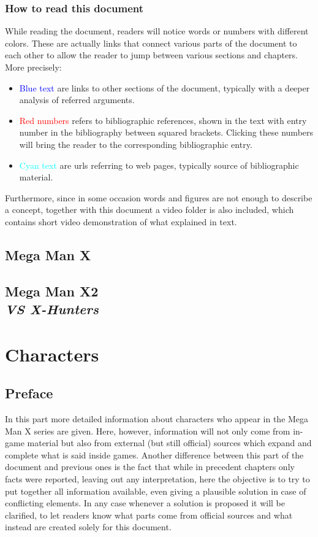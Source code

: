 \documentclass[openany]{report}
\begin{document}
	\section*{How to read this document}
	While reading the document, readers will notice words or numbers with different colors. These are actually links that connect various parts of the document to each other to allow the reader to jump between various sections and chapters. More precisely:
	\begin{itemize}
		\item \textcolor{blue}{Blue text} are links to other sections of the document, typically with a deeper analysis of referred arguments.
		\item \textcolor{red}{Red numbers} refers to bibliographic references, shown in the text with entry number in the bibliography between squared brackets. Clicking these numbers will bring the reader to the corresponding bibliographic entry.
		\item \textcolor{cyan}{Cyan text} are urls referring to web pages, typically source of bibliographic material.
	\end{itemize}
	
	Furthermore, since in some occasion words and figures are not enough to describe a concept, together with this document a video folder is also included, which contains short video demonstration of what explained in text.
	
\chapter{Mega Man X}
\label{cha:X1}
	

\chapter[Mega Man X2]{Mega Man X2\\[2ex]\Large\itshape{VS X-Hunters}}
\label{cha:X2}
	

\part{Characters}
	\chapter*{Preface}
	In this part more detailed information about characters who appear in the Mega Man X series are given. Here, however, information will not only come from in-game material but also from external (but still official) sources which expand and complete what is said inside games. Another difference between this part of the document and previous ones is the fact that while in precedent chapters only facts were reported, leaving out any interpretation, here the objective is to try to put together all information available, even giving a plausible solution in case of conflicting elements. In any case whenever a solution is proposed it will be clarified, to let readers know what parts come from official sources and what instead are created solely for this document.
	
\end{document}
